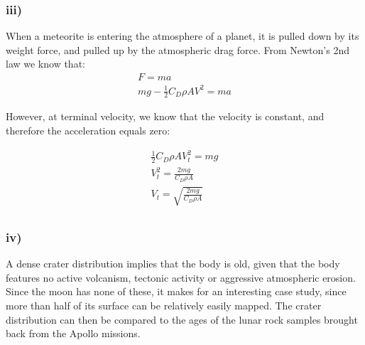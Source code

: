\subsubsection*{iii)}
When a meteorite is entering the atmosphere of a planet, it is pulled down by its weight force, and pulled up by the atmospheric drag force. From Newton's 2nd law we know that:
\begin{equation*}
\begin{split}
    F = ma \\
    mg - \frac{1}{2} C_D \rho A V^2 = ma
\end{split}
\end{equation*}

However, at terminal velocity, we know that the velocity is constant, and therefore the acceleration equals zero:

\begin{equation*}
\begin{split}
    \frac{1}{2} C_D \rho A V_t^2 = mg\\
    V_t^2 = \frac{2 m g}{C_D \rho A}\\
    V_t = \sqrt{\frac{2 m g}{C_D \rho A}}\\
\end{split}
\end{equation*}

\subsubsection*{iv)}
A dense crater distribution implies that the body is old, given that the body features no active volcanism, tectonic activity or aggressive atmospheric erosion. Since the moon has none of these, it makes for an interesting case study, since more than half of its surface can be relatively easily mapped. The crater distribution can then be compared to the ages of the lunar rock samples brought back from the Apollo missions. 